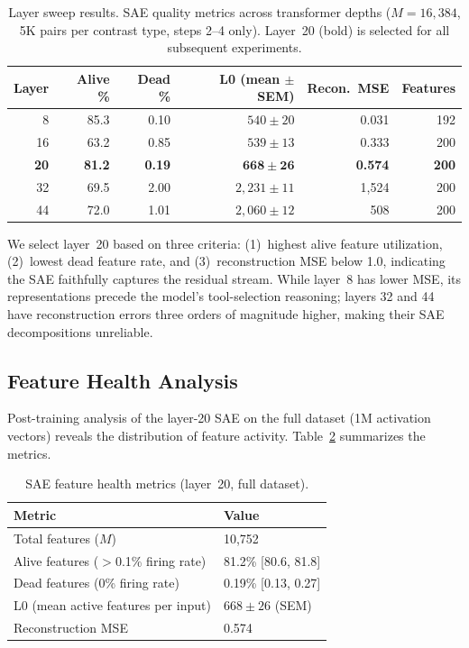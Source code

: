 \documentclass[runningheads]{llncs}
\begin{document}
\begin{table}[t]
\caption{Layer sweep results. SAE quality metrics across transformer depths ($M = 16{,}384$, 5K pairs per contrast type, steps 2--4 only). Layer~20 (bold) is selected for all subsequent experiments.}
\label{tab:layer_sweep}
\centering
\begin{tabular}{rrrrrr}
\toprule
Layer & Alive \% & Dead \% & L0 (mean $\pm$ SEM) & Recon.\ MSE & Features \\
\midrule
8  & 85.3 & 0.10 & $540 \pm 20$   & 0.031   & 192 \\
16 & 63.2 & 0.85 & $539 \pm 13$   & 0.333   & 200 \\
\textbf{20} & \textbf{81.2} & \textbf{0.19} & $\mathbf{668 \pm 26}$ & \textbf{0.574} & \textbf{200} \\
32 & 69.5 & 2.00 & $2{,}231 \pm 11$ & 1{,}524 & 200 \\
44 & 72.0 & 1.01 & $2{,}060 \pm 12$ & 508     & 200 \\
\bottomrule
\end{tabular}
\end{table}

We select layer~20 based on three criteria: (1)~highest alive feature utilization, (2)~lowest dead feature rate, and (3)~reconstruction MSE below 1.0, indicating the SAE faithfully captures the residual stream. While layer~8 has lower MSE, its representations precede the model's tool-selection reasoning; layers 32 and 44 have reconstruction errors three orders of magnitude higher, making their SAE decompositions unreliable.

\subsection{Feature Health Analysis}

Post-training analysis of the layer-20 SAE on the full dataset (1M activation vectors) reveals the distribution of feature activity. Table~\ref{tab:health} summarizes the metrics.

\begin{table}[t]
\caption{SAE feature health metrics (layer~20, full dataset).}
\label{tab:health}
\centering
\begin{tabular}{ll}
\toprule
Metric & Value \\
\midrule
Total features ($M$) & 10,752 \\
Alive features ($>$0.1\% firing rate) & 81.2\% [80.6, 81.8] \\
Dead features (0\% firing rate) & 0.19\% [0.13, 0.27] \\
L0 (mean active features per input) & $668 \pm 26$ (SEM) \\
Reconstruction MSE & 0.574 \\
\bottomrule
\end{tabular}
\end{table}
\end{document}

